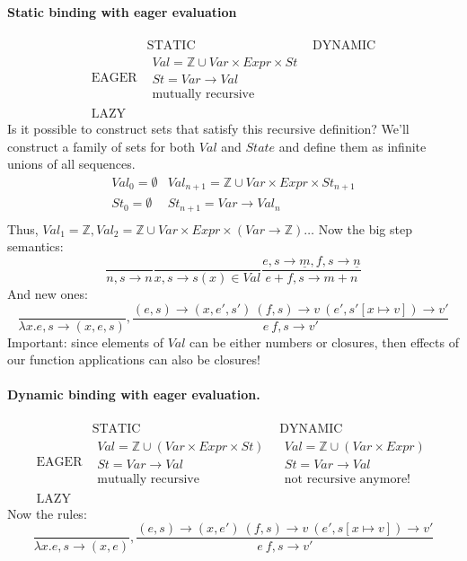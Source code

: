 \documentclass{article}
\begin{document}
\paragraph{Static binding with eager evaluation}
$$
\begin{matrix}
& \text{STATIC}& \text{DYNAMIC}\\
\text{EAGER}&
	\begin{matrix}
	Val=\mathbb{Z}\cup Var\times Expr\times St\\
	St=Var\rightarrow Val\\
	\text{mutually recursive}
	\end{matrix}&\\
\text{LAZY}&&
\end{matrix}
$$
Is it possible to construct sets that satisfy this recursive definition? We'll construct a family of sets for both $ Val $ and $ State $ and define them as infinite unions of all sequences.
$$
\begin{matrix}
Val_0=\emptyset & Val_{n+1}=\mathbb{Z}\cup Var\times Expr\times St_{n+1}\\
St_0=\emptyset  & St_{n+1}=Var\rightarrow Val_n\\
\end{matrix}
$$
Thus, $ Val_1=\mathbb{Z}, Val_2=\mathbb{Z}\cup Var\times Expr\times(Var\rightarrow \mathbb{Z})\ldots $
Now the big step semantics:
$$\frac{}{n,s\rightarrow n}\frac{}{x,s\rightarrow s(x)\in Val}
\frac{e,s\rightarrow\underline{m}, f,s\rightarrow \underline{n}}{e+f,s\rightarrow m+n}$$
And new ones:
$$\frac{}{\lambda x.e,s\rightarrow (x, e,s)},
\frac{(e, s)\rightarrow (x, e', s')\ (f, s) \rightarrow v\ (e', s'[x\mapsto v])\rightarrow v'}{e\ f,s\rightarrow v'}$$
Important: since elements of $Val$ can be either numbers or closures, then effects of our function applications can also be closures!
\paragraph{Dynamic binding with eager evaluation.}
$$
\begin{matrix}
& \text{STATIC}& \text{DYNAMIC}\\
	\text{EAGER} &
	\begin{matrix}
		Val=\mathbb{Z}\cup (Var\times Expr\times St)\\
		St=Var\rightarrow Val\\
		\text{mutually recursive}
	\end{matrix} &
	\begin{matrix}
		Val=\mathbb{Z}\cup (Var\times Expr)\\
		St=Var\rightarrow Val\\
		\text{not recursive anymore!}
	\end{matrix}\\
\text{LAZY}&&
\end{matrix}
$$
Now the rules:
$$\frac{}{\lambda x.e,s\rightarrow (x, e)},
\frac{(e, s)\rightarrow (x, e')\ (f, s) \rightarrow v\ (e', s[x\mapsto v])\rightarrow v'}{e\ f,s\rightarrow v'}$$
\end{document}
